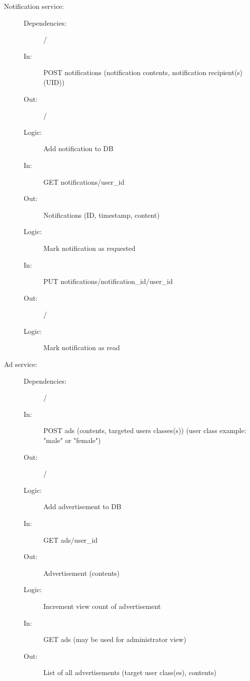 \documentclass{article}
\begin{document}
\begin{description}
    \item [Notification service:]
    \begin{description}
        \item[]
        \item[Dependencies:] /
    \end{description}
    \begin{description}
        \item[]
        \item[In:] POST notifications (notification contents, notification recipient(s) (UID))
        \item[Out:] /
        \item[Logic:] Add notification to DB
        \item[]
        
        \item[In:] GET notifications/user\_id 
        \item[Out:] Notifications (ID, timestamp, content)
        \item[Logic:] Mark notification as requested
        \item[]
        
        \item[In:] PUT notifications/notification\_id/user\_id
        \item[Out:] /
        \item[Logic: ] Mark notification as read
    \end{description}
\end{description}

\begin{description}
    \item [Ad service:]
    \begin{description}
        \item[]
        \item[Dependencies:] /
    \end{description}
    \begin{description}
        \item[]
        \item[In:] POST ads (contents, targeted users classes(s)) (user class example: "male" or "female")
        \item[Out:] /
        \item[Logic:] Add advertisement to DB
        \item[]
        
        \item[In:] GET ads/user\_id
        \item[Out:] Advertisement (contents)
        \item[Logic:] Increment view count of advertisement
        \item[]
        
        \item[In:] GET ads (may be used for administrator view)
        \item[Out:] List of all advertisements (target user class(es), contents)
    \end{description}
\end{description}
\end{document}
